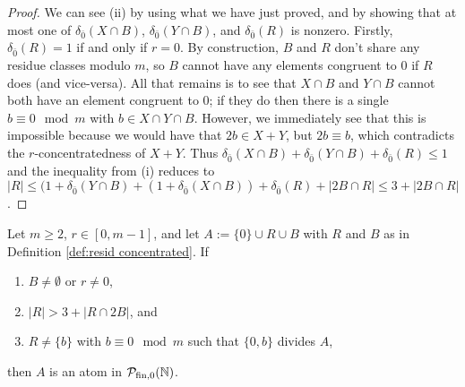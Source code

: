 \begin{proof}
We can see (ii) by using what we have just proved, and by showing that at most one of $\delta_{\bar{0}}(X\cap B)$, $\delta_{\bar{0}}(Y\cap B)$, and $\delta_{\bar{0}}(R)$ is nonzero.
Firstly, $\delta_{\bar{0}}(R) = 1$ if and only if $r = 0$.
By construction, $B$ and $R$ don't share any residue classes modulo $m$, so $B$ cannot have any elements congruent to $0$ if $R$ does (and vice-versa).  
All that remains is to see that $X\cap B$ and $Y\cap B$ cannot both have an element congruent to $0$; if they do then there is a single $b \equiv 0 \mod m$ with $b\in X\cap Y \cap B$.
However, we immediately see that this is impossible because we would have that $2b \in X+Y$, but $2b \equiv b$, which contradicts the $r$-concentratedness of $X+Y$.
Thus $\delta_{\bar{0}}(X\cap B) + \delta_{\bar{0}}(Y\cap B) + \delta_{\bar{0}}(R) \le 1$ and the inequality from (i) reduces to $|R| \le (1+\delta_{\bar{0}}(Y\cap B)+ (1+\delta_{\bar{0}}(X\cap B)) + \delta_{\bar{0}}(R) + |2B\cap R| \le 3 + |2B \cap R|$.
\end{proof}

\begin{prop} \label{prop:resid concentrated atoms}
Let $m\ge 2$, $r\in [0,m-1]$, and let $A := \{0\}\cup R \cup B$ with $R$ and $B$ as in Definition \ref{def:resid concentrated}.
If 
\begin{enumerate}[label={\rm (\arabic{*})}]
	\item $B\neq \emptyset$ or $r\neq 0$,
	\item $|R| > 3 + |R\cap 2B|$, and
	\item $R \neq \{b\}$ with $b\equiv 0 \mod m$ such that $\{0,b\}$ divides $A$,
\end{enumerate}
then $A$ is an atom in ${\mathcal{P}_{\textrm{fin},0}(\mathbb{N})}$.
\end{prop}

